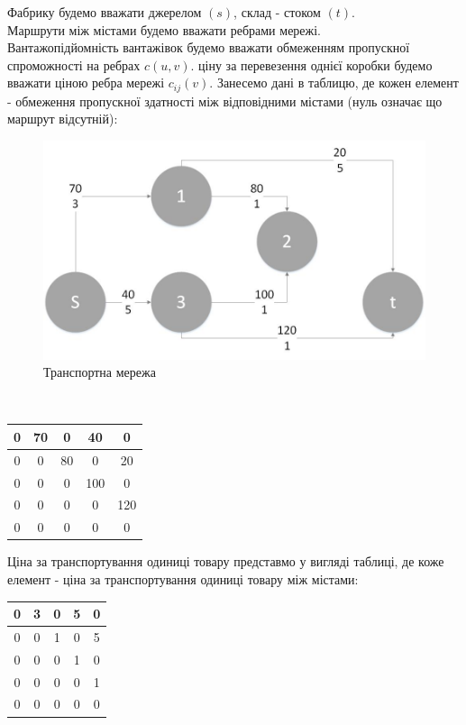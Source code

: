 \documentclass[a4paper,14pt,russian,ukrainian,oneside,final]{extreport}
\begin{document}
\indent Фабрику будемо вважати джерелом $(s)$, склад - стоком $(t)$. \\
Маршрути між містами будемо вважати ребрами мережі.\\
Вантажопідйомність вантажівок будемо вважати обмеженням пропускної спроможності на ребрах $c(u,v)$.
ціну за перевезення однієї коробки будемо вважати ціною ребра мережі $c_{ij}(v)$.
Занесемо дані в таблицю, де кожен елемент - обмеження пропускної здатності між відповідними містами (нуль означає що маршрут відсутній):
\begin{figure}[h]
\begin{center}
\includegraphics[scale=0.65]{G1.jpg}
\caption{Транспортна мережа}
\end{center}
\end{figure}
\\
\begin{center}
\begin{tabular}{|c|c|c|c|c|}
\hline
0&70&0&40&0 \\
\hline
0&0&80&0&20 \\
\hline
0&0&0&100&0 \\
\hline
0&0&0&0&120 \\
\hline
0&0&0&0&0 \\
\hline
\end{tabular}
\end{center}
Ціна за транспортування одиниці товару представмо у вигляді таблиці, де коже елемент - ціна за транспортування одиниці товару між містами:
\begin{center}
\begin{tabular}{|c|c|c|c|c|}
\hline
0&3&0&5&0 \\
\hline
0&0&1&0&5 \\
\hline
0&0&0&1&0 \\
\hline
0&0&0&0&1 \\
\hline
0&0&0&0&0 \\
\hline
\end{tabular}
\end{center}
\end{document}
